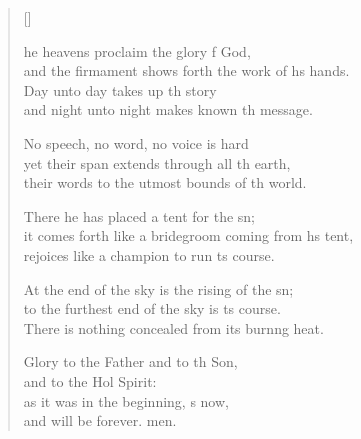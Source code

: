 \settowidth{\versewidth}{it comes forth like a bridegroom coming from his tent, *}
\begin{verse}[\versewidth]
  \begin{patverse}
he heavens proclaim the glory f God,\Med\\
and the firmament shows forth the work of h\pointup{\i}s hands.\\
Day unto day takes up th story\Med\\
and night unto night makes known th message.

No speech, no word, no voice is hard\Flex\\
yet their span extends through all th earth,\Med\\
their words to the utmost bounds of th world.

There he has placed a tent for the sn;\Flex\\
it comes forth like a bridegroom coming from hs tent,\Med\\
rejoices like a champion to run \pointup{\i}ts course.

At the end of the sky is the rising of the sn;\Flex\\
to the furthest end of the sky is ts course.\Med\\
There is nothing concealed from its burn\pointup{\i}ng heat.

Glory to the Father and to th Son,\Med\\
and to the Hol Spirit:\\
as it was in the beginning, s now,\Med\\
and will be forever. men. 
  \end{patverse}
\end{verse}
